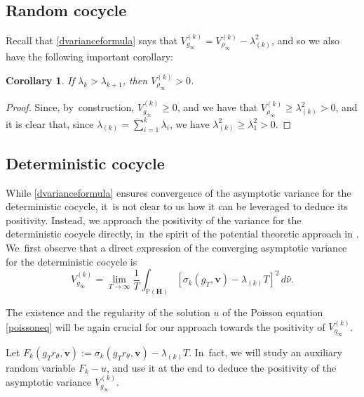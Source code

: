 \documentclass[10pt]{amsart}
\theoremstyle{plain}
\newtheorem{cor}[thm]{Corollary}
\theoremstyle{definition}
\numberwithin{equation}{subsection}
\newcommand\bP{\mathbb{P}}
\newcommand{\bfH}{\boldsymbol{H}}
\newcommand{\bfv}{\boldsymbol{v}}
\newcommand{\defeq}{:=}
\begin{document}
\subsection{Random cocycle}\label{vrclt}
Recall that \eqref{dvarianceformula} says that $V^{(k)}_{g_\infty} = V^{(k)}_{\rho_\infty} -\lambda_{(k)}^2$, and so we also have the following important corollary:
\begin{cor}
If $\lambda_k>\lambda_{k+1}$, then $V^{(k)}_{\rho_\infty} > 0$. \end{cor}
\begin{proof}
Since, by~construction, $V^{(k)}_{g_\infty}\geq 0$, and we have that $V^{(k)}_{\rho_\infty} \geq \lambda_{(k)}^2 >0$, and it is clear that, since $\lambda_{(k)} = \sum_{i=1}^k\lambda_i$, we have $\lambda_{(k)}^2 \geq \lambda_1^2>0$.
\end{proof}

\subsection{Deterministic cocycle}
\label{posvar:det}
While \eqref{dvarianceformula} ensures convergence of the asymptotic variance for the deterministic cocycle, it~is not clear to us how it can be leveraged to deduce its positivity. Instead, we approach the positivity of the variance for the deterministic cocycle directly, in~the spirit of the potential theoretic approach in \cite{For02}. We~first observe that a direct expression of the converging asymptotic variance for the deterministic cocycle is
\begin{equation}
\label{eq:det_var}
V^{(k)}_{g_\infty} = \lim_{T\to\infty} \frac{1}{T} \int_{\bP(\bfH)} \left[\sigma_k(g_T, \bfv) -\lambda_{(k)} T \right]^2 \,d\hat{\nu}.
\end{equation}

The existence and the regularity of the solution
$u$ of the Poisson equation \eqref{poissoneq} will be again crucial for our approach towards the positivity of $V^{(k)}_{g_\infty}$.

Let $F_k(g_T r_\theta,\bfv) \defeq \sigma_k(g_T r_\theta, \bfv) -\lambda_{(k)} T$. In~fact, we will study an auxiliary random variable $F_k- u$, and use it at the end to deduce the positivity of the asymptotic variance $V^{(k)}_{g_\infty}$.
\end{document}
